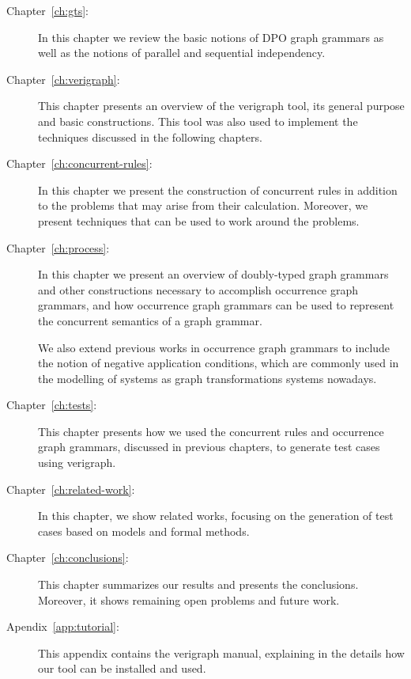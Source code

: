 \begin{description}
  \item[Chapter~\ref{ch:gts}:] In this chapter we review the basic notions of DPO graph grammars as well as the notions of parallel and sequential independency.
  \item[Chapter~\ref{ch:verigraph}:] This chapter presents an overview of the verigraph tool, its general purpose and basic constructions. This tool was also used to implement the techniques discussed in the following chapters.
  \item[Chapter~\ref{ch:concurrent-rules}:] In this chapter we present the construction of concurrent rules in addition to the problems that may arise from their calculation. Moreover, we present techniques that can be used to work around the problems.
  \item[Chapter~\ref{ch:process}:] In this chapter we present an overview of doubly-typed graph grammars and other constructions necessary to accomplish occurrence graph grammars, and how occurrence graph grammars can be used to represent the concurrent semantics of a graph grammar.

    We also extend previous works in occurrence graph grammars to include the notion of negative application conditions, which are commonly used in the modelling of systems as graph transformations systems nowadays.
  \item[Chapter~\ref{ch:tests}:] This chapter presents how we used the concurrent rules and occurrence graph grammars, discussed in previous chapters, to generate test cases using verigraph.
  \item[Chapter~\ref{ch:related-work}:] In this chapter, we show related works, focusing on the generation of test cases based on models and formal methods.
  \item[Chapter~\ref{ch:conclusions}:] This chapter summarizes our results and presents the conclusions. Moreover, it shows remaining open problems and future work.
  \item[Apendix~\ref{app:tutorial}:] This appendix contains the verigraph manual, explaining in the details how our tool can be installed and used.
\end{description}

